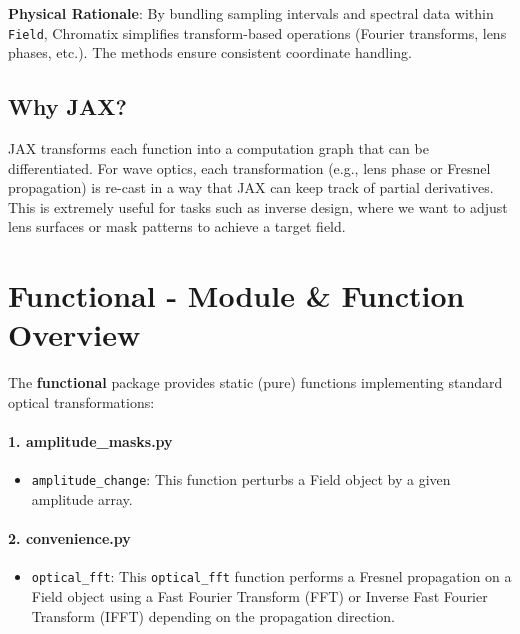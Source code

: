 \documentclass[a4paper,12pt]{report}
\begin{document}
\noindent\textbf{Physical Rationale}: By bundling sampling intervals and spectral data within \texttt{Field}, Chromatix simplifies transform-based operations (Fourier transforms, lens phases, etc.). The methods ensure consistent coordinate handling.

\subsection{Why JAX?}
JAX transforms each function into a computation graph that can be differentiated. For wave optics, each transformation (e.g., lens phase or Fresnel propagation) is re-cast in a way that JAX can keep track of partial derivatives. This is extremely useful for tasks such as inverse design, where we want to adjust lens surfaces or mask patterns to achieve a target field.

\section{Functional - Module \& Function Overview}
The \textbf{functional} package provides static (pure) functions implementing standard optical transformations:

\paragraph*{1. \textbf{amplitude\_masks.py}}
\begin{itemize}
  \item \texttt{amplitude\_change}: This function perturbs a Field object by a given amplitude array.
\end{itemize}

\paragraph*{2. \textbf{convenience.py}}
\begin{itemize}
  \item \texttt{optical\_fft}: This \texttt{optical\_fft} function performs a Fresnel propagation on a Field object using a Fast Fourier Transform (FFT) or Inverse Fast Fourier Transform (IFFT) depending on the propagation direction.
\end{itemize}

\end{document}
